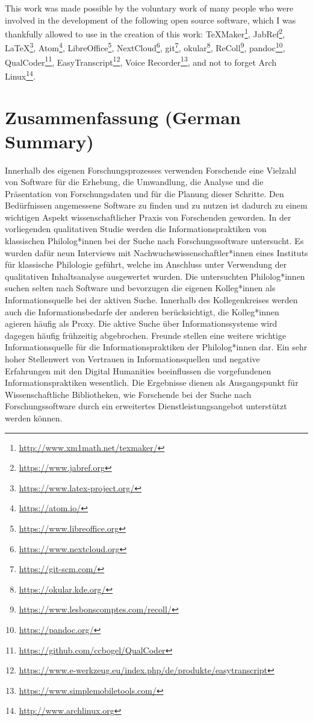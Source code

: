 \documentclass[12pt, a4paper, titlepage, oneside, abstract=true, toc=listof, toc=bibliography, BCOR=1cm]{scrreprt}
\begin{document}
{This work was made possible by the voluntary work of many people who were involved in the development of the following open source software, which I was thankfully allowed to use in the creation of this work: TeXMaker\footnote{\url{http://www.xm1math.net/texmaker/}}, JabRef\footnote{\url{https://www.jabref.org}}, \LaTeX\footnote{\url{https://www.latex-project.org/}}, Atom\footnote{\url{https://atom.io/}}, LibreOffice\footnote{\url{https://www.libreoffice.org}}, NextCloud\footnote{\url{https://www.nextcloud.org}}, git\footnote{\url{https://git-scm.com/}}, okular\footnote{\url{https://okular.kde.org/}}, ReColl\footnote{\url{https://www.lesbonscomptes.com/recoll/}}, pandoc\footnote{\url{https://pandoc.org/}}, QualCoder\footnote{\url{https://github.com/ccbogel/QualCoder}}, EasyTranscript\footnote{\url{https://www.e-werkzeug.eu/index.php/de/produkte/easytranscript}}, Voice Recorder\footnote{\url{https://www.simplemobiletools.com/}}, and not to forget Arch Linux\footnote{\url{http://www.archlinux.org}}.

\chapter{Zusammenfassung (German Summary)}

Innerhalb des eigenen Forschungsprozesses verwenden Forschende eine Vielzahl von Software für die Erhebung, die Umwandlung, die Analyse und die Präsentation von Forschungsdaten und für die Planung dieser Schritte. 
Den Bedürfnissen angemessene Software zu finden und zu nutzen ist dadurch zu einem wichtigen Aspekt wissenschaftlicher Praxis von Forschenden geworden. 
In der vorliegenden qualitativen Studie werden die Informationspraktiken von klassischen Philolog*innen bei der Suche nach Forschungssoftware untersucht. Es wurden dafür neun Interviews mit Nachwuchswissenschaftler*innen eines Instituts für klassische Philologie geführt, welche im Anschluss unter Verwendung der qualitativen Inhaltsanalyse ausgewertet wurden. 
Die untersuchten Philolog*innen suchen selten nach Software und bevorzugen die eigenen Kolleg*innen als Informationsquelle bei der aktiven Suche. Innerhalb des Kollegenkreises werden auch die Informationsbedarfe der anderen berücksichtigt, die Kolleg*innen agieren häufig als Proxy. Die aktive Suche über Informationssysteme wird dagegen häufig frühzeitig abgebrochen. Freunde stellen eine weitere wichtige Informationsquelle für die Informationspraktiken der Philolog*innen dar. Ein sehr hoher Stellenwert von Vertrauen in Informationsquellen und negative Erfahrungen mit den Digital Humanities beeinflussen die vorgefundenen Informationspraktiken wesentlich.
Die Ergebnisse dienen als Ausgangspunkt für Wissenschaftliche Bibliotheken, wie Forschende bei der Suche nach Forschungssoftware durch ein erweitertes Dienstleistungsangebot unterstützt werden können.


}
\end{document}
